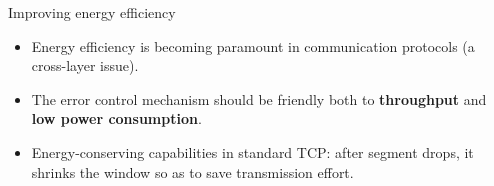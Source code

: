 \begin{frame}{Improving energy efficiency}
	\begin{itemize}
		\item Energy efficiency is becoming paramount
		      in communication protocols (a cross-layer issue).
		\item The error control mechanism should
		      be friendly both to \textbf{throughput} and \textbf{low power consumption}.
		\item Energy-conserving capabilities in standard TCP: \newline
		      after segment drops, it shrinks the window so as to
		      save transmission effort.
	\end{itemize}

\end{frame}
